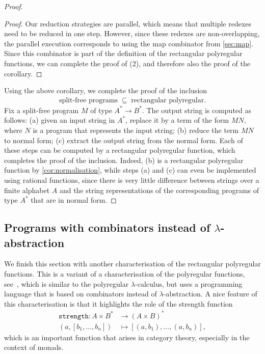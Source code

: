 \documentclass[a4paper,UKenglish,cleveref, autoref, thm-restate]{lipics-v2021}
\begin{document}
\begin{proof}
\begin{proof}
        Our reduction strategies are parallel, which means that multiple redexes need to be reduced in one step. However, since these redexes are non-overlapping, the parallel execution corresponds to using the map combinator from \cref{sec:map}. Since this combinator is part of the definition of the rectangular polyregular functions, we can complete the proof of (2), and therefore also the proof of the corollary.
    \end{proof}
    Using the above corollary, we complete the proof of the inclusion
        \begin{align*}
    \text{split-free programs} 
    \; \subseteq \;
    \text{rectangular polyregular}.
    \end{align*}
Fix  a split-free program $M$ of type  $A^* \to B^*$. The output string is computed as follows: (a) given an input string in $A^*$, replace it by  a term of the form $M N$, where $N$ is a program that represents the input string; (b) reduce the term $M N$ to normal form; (c) extract the output string from the normal form. Each of these steps can be computed by a rectangular polyregular function, which completes the proof of the inclusion. Indeed, (b) is a rectangular polyregular function by \cref{cor:normalisation}, while steps (a) and (c) can even be implemented using rational functions, since  there is very little difference between strings over a finite alphabet $A$ and the string representations of the corresponding programs of type $A^*$ that are in normal form. 
\end{proof}


 \subsection{Programs with combinators instead of \texorpdfstring{$\lambda$}{lambda}-abstraction}
We finish this section with another characterisation of the rectangular polyregular functions. This is a variant of a characterisation of the polyregular functions, see~\cite[Section 4]{bojanczykPolyregularFunctions2018}, which is similar to the polyregular $\lambda$-calculus, but uses a programming language that is based on  combinators instead of  $\lambda$-abstraction. A nice feature of this characterisation is that it highlights the role of the strength function 
\begin{align} \label{eq:strength}
        \mathtt{strength} : A \times B^* & \to (A \times B)^* \\
        (a, [b_1,\ldots,b_n]) & \mapsto [(a,b_1),\ldots,(a,b_n)], \nonumber
        \end{align}
which is an important function that arises in category theory, especially in the context of monads.
\end{document}
